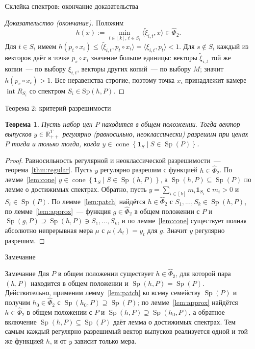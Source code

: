 \documentclass[10pt,aspectratio=169]{beamer}
\theoremstyle{plain}
\newtheorem{thm}{Теорема}
\theoremstyle{definition}
\newcommand{\R}{\mathbb{R}}
\newcommand{\set}[1]{\left\{ #1 \right\}}
\newcommand{\ip}[2]{\langle #1, #2\rangle}
\newcommand{\Rpp}[1][2]{\R^{#1}_{++}}
\DeclareMathOperator{\cone}{cone}
\DeclareMathOperator{\interior}{int}
\DeclareMathOperator{\Sp}{Sp}
\newcommand{\PhiHat}{\hat{\Phi}}
\begin{document}
\begin{frame}{Склейка спектров: окончание доказательства}
    \begin{proof}[Доказательство (окончание)]
        Положим
        \[
            h(x):=\min_{i\in[k],\,t\in S_i}\ip{\tilde\xi_{i,t}}{x}\in\hat\Phi_2.
        \]
        Для $t\in S_i$ имеем $h(p_t\circ x_i)\le\ip{\tilde\xi_{i,t}}{p_t\circ x_i}=\ip{\xi_{i,t}}{p_t}<1$. Для $s\notin S_i$ каждый из векторов даёт в точке $p_s\circ x_i$ значение больше единицы: векторы $\tilde\xi_{i,t}$ той же копии~--- по выбору $\xi_{i,t}$, векторы других копий~--- по выбору $M$; значит $h(p_s\circ x_i)>1$. Все неравенства строгие, поэтому точка $x_i$ принадлежит камере $\interior R_{S_i}$ со спектром $S_i\in\mathrm{Sp}(h,P)$.
    \end{proof}
\end{frame}

\begin{frame}{Теорема 2: критерий разрешимости}
    \begin{thm}\label{thm:admissible-cone}
        Пусть набор цен $P$ находится в общем положении. Тогда вектор выпусков $y\in\Rpp[T]$ регулярно (равносильно, неоклассически) разрешим при ценах $P$ тогда и только тогда, когда $y\in\cone\set{\mathbf 1_S\mid S\in\Sp(P)}$.
    \end{thm}

    \begin{proof}
        Равносильность регулярной и неоклассической разрешимости~--- теорема~\ref{thm:regular}. Пусть $y$ регулярно разрешим с функцией $h\in\PhiHat_2$. По лемме~\ref{lem:cone} $y\in\cone\set{\mathbf 1_S\mid S\in\Sp(h,P)}$, а $\Sp(h,P)\subseteq\Sp(P)$ по лемме о достижимых спектрах. Обратно, пусть $y=\sum_{i\in[k]}m_i\mathbf 1_{S_i}$ с $m_i>0$ и $S_i\in\Sp(P)$. По лемме~\ref{lem:patch} найдётся $h\in\PhiHat_2$ с $S_1,\dots,S_k\in\Sp(h,P)$, по лемме~\ref{lem:approx}~--- функция $g\in\PhiHat_2$ в общем положении с $P$ и $\Sp(g,P)\supseteq\Sp(h,P)\ni S_1,\dots,S_k$, и по лемме~\ref{lem:cone} существует полная абсолютно непрерывная мера $\mu$ с $\mu(A_t)=y_t$ для $g$. Значит $y$ регулярно разрешим.
    \end{proof}
\end{frame}

\begin{frame}{Замечание}
    \begin{block}{Замечание}
        Для $P$ в общем положении существует $h\in\PhiHat_2$, для которой пара $(h,P)$ находится в общем положении и $\Sp(h,P)=\Sp(P)$. Действительно, применим лемму~\ref{lem:patch} ко всему семейству $\Sp(P)$ и получим $h_0\in\PhiHat_2$ с $\Sp(h_0,P)\supseteq\Sp(P)$; по лемме~\ref{lem:approx} найдётся $h\in\PhiHat_2$ в общем положении с $P$ и $\Sp(h,P)\supseteq\Sp(h_0,P)$, а обратное включение $\Sp(h,P)\subseteq\Sp(P)$ даёт лемма о достижимых спектрах. Тем самым каждый регулярно разрешимый вектор выпусков реализуется одной и той же функцией $h$, и от $y$ зависит только мера.
    \end{block}
\end{frame}
\end{document}
